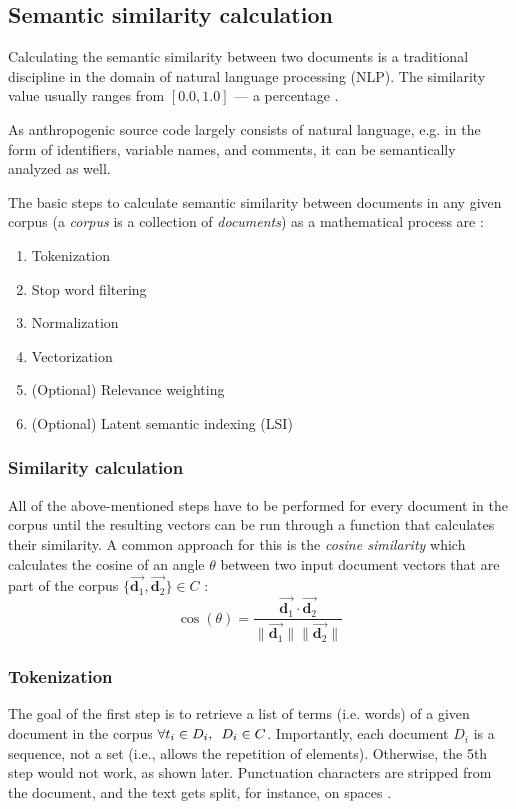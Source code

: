 \documentclass[12pt,a4paper]{report}
\begin{document}
\subsection{Semantic similarity calculation} \label{subsect:semantic-similarity}

Calculating the semantic similarity between two documents is a traditional
discipline in the domain of natural language processing (NLP). The similarity
value usually ranges from \([0.0, 1.0]\) --- a percentage \cite{singhal2001ir}.

As anthropogenic source code largely consists of natural language, e.g. in
the form of identifiers, variable names, and comments, it can be semantically
analyzed as well.

The basic steps to calculate semantic similarity between documents in any given
corpus (a \textit{corpus} is a collection of \textit{documents}) as a
mathematical process are \cite{singhal2001ir}:
\begin{enumerate}
  \item Tokenization
  \item Stop word filtering
  \item Normalization
  \item Vectorization
  \item (Optional) Relevance weighting
  \item (Optional) Latent semantic indexing (LSI)
\end{enumerate}


\subsubsection{Similarity calculation}
All of the above-mentioned steps have to
be performed for every document in the corpus until the resulting vectors can
be run through a function that calculates their similarity. A common approach
for this is the \textit{cosine similarity} which calculates the cosine of an
angle \(\theta\) between two input document vectors that are part of the corpus
\(\{\vec{\mathbf d_1}, \vec{\mathbf d_2}\} \in C\) \cite{singhal2001ir}:
\[
  \cos(\theta) = \frac{
    \vec{\mathbf d_1} \cdot \vec{\mathbf d_2}
  }{
    \|\vec{\mathbf d_1} \|\|\vec{\mathbf d_2} \|
  }
\]


\subsubsection{Tokenization}
The goal of the first step is to retrieve a list
of terms (i.e. words) of a given document in the corpus
\(\forall t_i \in D_i, \enskip D_i \in C\).
Importantly, each document \(D_i\) is a sequence, not a
set (i.e., allows the repetition of elements). Otherwise, the 5th step would
not work, as shown later. Punctuation characters are stripped
from the document, and the text gets split, for instance, on spaces \cite{singhal2001ir}.
\end{document}
